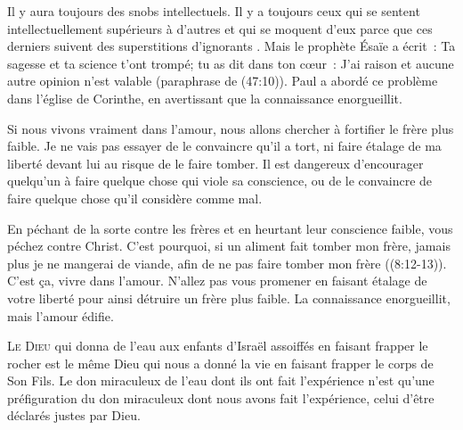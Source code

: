Il y aura toujours des snobs intellectuels.
 Il y a toujours ceux qui se sentent intellectuellement
 supérieurs à d'autres et qui se moquent d'eux
 parce que ces derniers suivent \og des superstitions d'ignorants \fg{}.
 Mais le prophète Ésaïe a écrit~: 
 \og Ta sagesse et ta science t'ont trompé;
 tu as dit dans ton c\oe{}ur~: 
 \og J'ai raison et aucune autre opinion n'est valable \fg{}
 (paraphrase de (47:10)).
 Paul a abordé ce problème dans l'église de Corinthe,
 en avertissant que \og la connaissance enorgueillit. \fg{}


Si nous vivons vraiment dans l'amour,
 nous allons chercher à fortifier le frère plus faible.
 Je ne vais pas essayer de le convaincre qu'il a tort,
 ni faire étalage de ma liberté devant lui
 au risque de le faire tomber.
 Il est dangereux d'encourager quelqu'un
 à faire quelque chose qui viole sa conscience,
 ou de le convaincre de faire quelque chose
 qu'il considère comme mal.

\og En péchant de la sorte contre les frères
 et en heurtant leur conscience faible,
 vous péchez contre Christ.
 C'est pourquoi, si un aliment fait tomber mon frère,
 jamais plus je ne mangerai de viande,
 afin de ne pas faire tomber mon frère \fg{}
 ((8:12-13)).
 C'est ça, vivre dans l'amour.
 N'allez pas vous promener en faisant étalage
 de votre liberté pour ainsi détruire un frère plus faible.
 La connaissance enorgueillit, mais l'amour édifie.

\dvrule






\lettrine{L}{e Dieu} qui donna de l'eau aux enfants d'Israël
 assoiffés en faisant frapper le rocher
 est le même Dieu qui nous a donné la vie
 en faisant frapper le corps de Son Fils.
 Le don miraculeux de l'eau dont ils ont fait l'expérience
 n'est qu'une préfiguration du don miraculeux
 dont nous avons fait l'expérience,
 celui d'être déclarés justes par Dieu.

